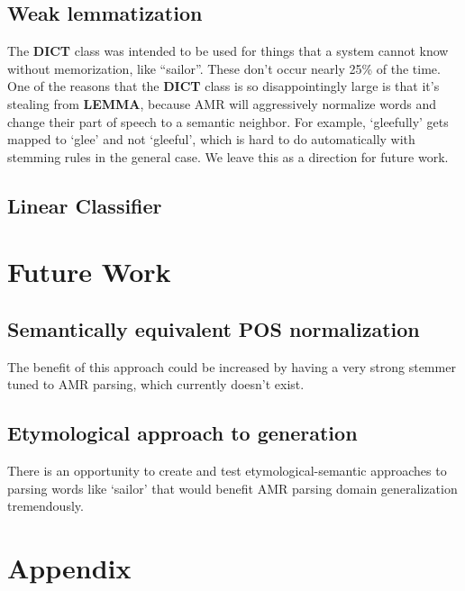 \documentclass[11pt]{article}
\begin{document}

\subsection{Weak lemmatization}

The \textbf{DICT} class was intended to be used for things that a system cannot know without memorization, like ``sailor''. These don't occur nearly 25\% of the time. One of the reasons that the \textbf{DICT} class is so disappointingly large is that it's stealing from \textbf{LEMMA}, because AMR will aggressively normalize words and change their part of speech to a semantic neighbor. For example, `gleefully' gets mapped to `glee' and not `gleeful', which is hard to do automatically with stemming rules in the general case. We leave this as a direction for future work.

\subsection{Linear Classifier}

\section{Future Work}
\subsection{Semantically equivalent POS normalization}
The benefit of this approach could be increased by having a very strong stemmer tuned to AMR parsing, which currently doesn't exist.
\subsection{Etymological approach to generation}
There is an opportunity to create and test etymological-semantic approaches to parsing words like `sailor' that would benefit AMR parsing domain generalization tremendously.

\section{Appendix}
\end{document}
